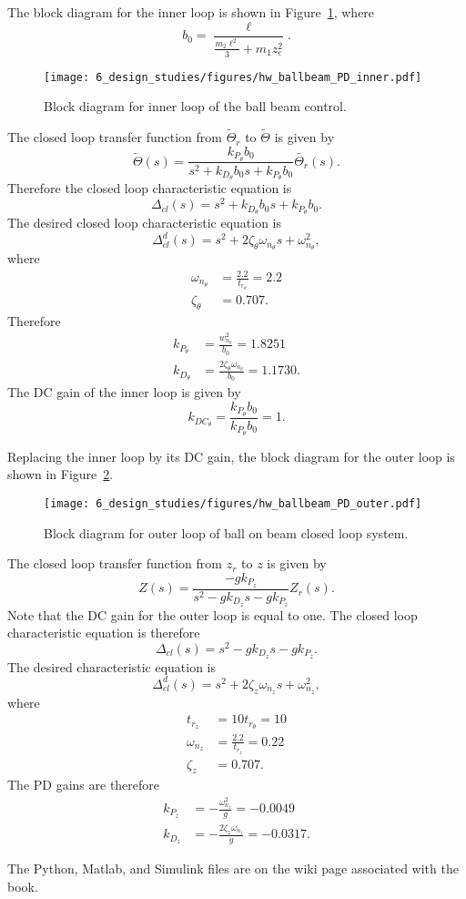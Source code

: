 The block diagram for the inner loop is shown in Figure~\ref{fig:hw_ballbeam_PD_inner},
where 
\[
b_0 = \frac{\ell}{\frac{m_2\ell^2}{3}+m_1z_e^2}.
\]
\begin{figure}[H]
   \centering
   \texttt{[image: 6\_design\_studies/figures/hw\_ballbeam\_PD\_inner.pdf]}
   \caption{Block diagram for inner loop of the ball beam control.}
   \label{fig:hw_ballbeam_PD_inner}
\end{figure}

The closed loop transfer function from $\tilde{\Theta}_r$ to $\tilde{\Theta}$ is given by
\[
\tilde{\Theta}(s) = \frac{k_{P_\theta}b_0}{s^2+k_{D_\theta}b_0s+k_{P_\theta}b_0} \tilde{\Theta_r}(s).
\]
Therefore the closed loop characteristic equation is
\[
\Delta_{cl}(s) = s^2+k_{D_\theta}b_0s+k_{P_\theta}b_0.
\]
The desired closed loop characteristic equation is
\[
\Delta_{cl}^d(s) = s^2 + 2\zeta_{\theta}\omega_{n_\theta} s + \omega_{n_\theta}^2,
\]
where
\begin{align*}
\omega_{n_\theta} &= \frac{2.2}{t_{r_\theta}} = 2.2 \\
\zeta_{\theta} &= 0.707.
\end{align*}
Therefore
\begin{align*}
k_{P_\theta} &= \frac{w_{n_\theta}^2}{b_0} = 1.8251 \\
k_{D_\theta} &= \frac{2\zeta_{\theta}\omega_{n_\theta}}{b_0} = 1.1730.
\end{align*}
The DC gain of the inner loop is given by
\[
k_{DC_{\theta}} = \frac{k_{P_\theta}b_0}{k_{P_\theta}b_0} = 1.
\]

Replacing the inner loop by its DC gain, the block diagram for the outer loop is shown in Figure~\ref{fig:hw_ballbeam_PD_outer}.
\begin{figure}[H]
   \centering
   \texttt{[image: 6\_design\_studies/figures/hw\_ballbeam\_PD\_outer.pdf]}
   \caption{Block diagram for outer loop of ball on beam closed loop system.}
   \label{fig:hw_ballbeam_PD_outer}
\end{figure}
The closed loop transfer function from $z_r$ to $z$ is given by
\[
Z(s) = \frac{-gk_{P_z}}{s^2-gk_{D_z}s-gk_{P_z}}Z_r(s).
\]
Note that the DC gain for the outer loop is equal to one.
The closed loop characteristic equation is therefore
\[
\Delta_{cl}(s) = s^2-gk_{D_z}s-gk_{P_z}.
\]
The desired characteristic equation is 
\[
\Delta_{cl}^d(s) = s^2 + 2\zeta_z\omega_{n_z}s + \omega_{n_z}^2,
\]
where
\begin{align*}
t_{r_z} &= 10 t_{r_\theta} = 10 \\
\omega_{n_z} &= \frac{2.2}{t_{r_z}} = 0.22 \\
\zeta_z &= 0.707.
\end{align*}
The PD gains are therefore
\begin{align*}
k_{P_z} &= -\frac{\omega_{n_z}^2}{g} = -0.0049 \\
k_{D_z} &= -\frac{2\zeta_z\omega_{n_z}}{g} = -0.0317.
\end{align*}

The Python, Matlab, and Simulink files are on the wiki page associated with the book.
